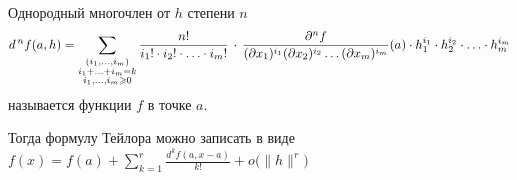 \begin{opr}
	Однородный многочлен от $h$ степени $n$ 
	\[d^{\,n} f(a, h) = \sum_{\substack{(i_1, \ldots, i_m) \\ i_1 + \ldots + i_m = k \\ i_1, \ldots, i_m \geqslant 0}} \frac{n!}{i_1! \cdot i_2! \cdot \ldots \cdot i_m!}\, \cdot \, \frac{\partial^nf}{(\partial x_1)^{i_1} (\partial x_2)^{i_2} \ldots (\partial x_m)^{i_m}} (a) \cdot h_1^{i_1} \cdot h_2^{i_2} \cdot \ldots \cdot h_m^{i_m}\] называется  функции $f$ в точке $a$.
\end{opr} %
 
Тогда формулу Тейлора можно записать в виде $\displaystyle f(x) = f(a) + \sum_{k = 1}^r \frac{d^kf(a, x - a)}{k!} + o\bigl(\|h\|^r\bigl)$
